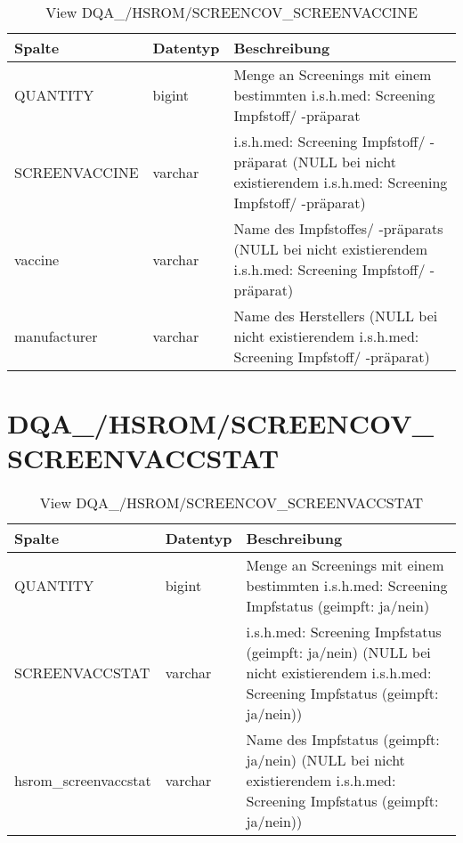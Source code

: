   \begin{table}[ht]
    \centering
    \caption{View DQA\_/HSROM/SCREENCOV\_SCREENVACCINE}
    \label{tab:dqa/hsrom/screencovscreenvaccine}
    \begin{tabular}{||l|l|p{10cm}||}
      \hline
      Spalte & Datentyp & Beschreibung \\ [0.5ex] \hline \hline
      QUANTITY & bigint & Menge an Screenings mit einem bestimmten i.s.h.med: Screening Impfstoff/ -präparat \\ \hline
      SCREENVACCINE & varchar & i.s.h.med: Screening Impfstoff/ -präparat (NULL bei nicht existierendem i.s.h.med: Screening Impfstoff/ -präparat)\\ \hline
       vaccine & varchar & Name des Impfstoffes/ -präparats (NULL bei nicht existierendem i.s.h.med: Screening Impfstoff/ -präparat)\\ \hline
        manufacturer & varchar & Name des Herstellers (NULL bei nicht existierendem i.s.h.med: Screening Impfstoff/ -präparat)\\ \hline
    \end{tabular}
  \end{table}

\clearpage

  \section{DQA\_/HSROM/SCREENCOV\_\\ SCREENVACCSTAT}

  \begin{table}[ht]
    \centering
    \caption{View DQA\_/HSROM/SCREENCOV\_SCREENVACCSTAT}
    \label{tab:dqa/hsrom/screencovscreenvaccstat}
    \begin{tabular}{||l|l|p{10cm}||}
      \hline
      Spalte & Datentyp & Beschreibung \\ [0.5ex] \hline \hline
      QUANTITY & bigint & Menge an Screenings mit einem bestimmten i.s.h.med: Screening Impfstatus (geimpft: ja/nein) \\ \hline
      SCREENVACCSTAT & varchar & i.s.h.med: Screening Impfstatus (geimpft: ja/nein) (NULL bei nicht existierendem i.s.h.med: Screening Impfstatus (geimpft: ja/nein))\\ \hline
      hsrom\_screenvaccstat & varchar & Name des Impfstatus (geimpft: ja/nein) (NULL bei nicht existierendem i.s.h.med: Screening Impfstatus (geimpft: ja/nein))\\ \hline
    \end{tabular}
  \end{table}
 \clearpage
